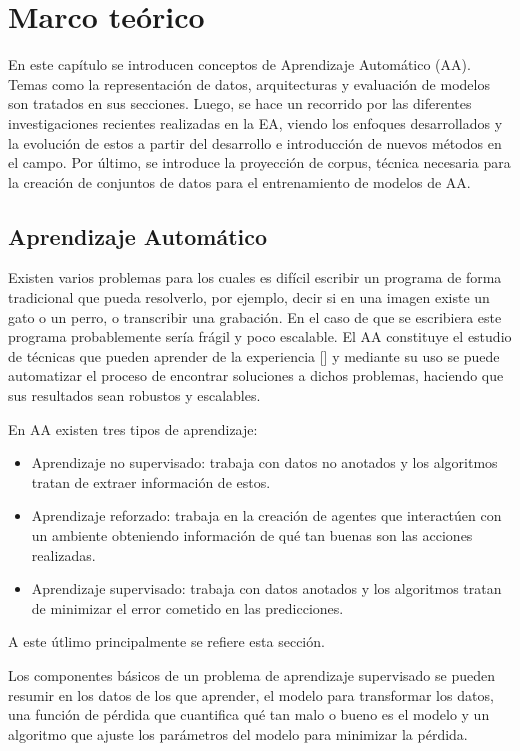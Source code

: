 \chapter{Marco teórico}\label{chapter:background}

En este capítulo se introducen conceptos de Aprendizaje Automático (AA). Temas
como la representación de datos, arquitecturas y evaluación de modelos son tratados en sus secciones.
Luego, se hace un recorrido por las diferentes investigaciones recientes realizadas en la EA, viendo
los enfoques desarrollados y la evolución de estos a partir del desarrollo e introducción de nuevos métodos en el
campo. Por último, se introduce la proyección de corpus, técnica necesaria para la creación de conjuntos 
de datos para el entrenamiento de modelos de AA.

\section{Aprendizaje Automático}

Existen varios problemas para los cuales es difícil escribir un programa de forma tradicional que pueda
resolverlo, por ejemplo, decir si en una imagen existe un gato o un perro, o transcribir una grabación. En el caso
de que se escribiera este programa probablemente sería frágil y poco escalable. El AA constituye el 
estudio de técnicas que pueden aprender de la experiencia [\cite{d2l}] y mediante su uso 
se puede automatizar el proceso de encontrar soluciones a dichos problemas, haciendo que sus resultados sean 
robustos y escalables. 

En AA existen tres tipos de aprendizaje:
\begin{itemize}
	\item Aprendizaje no supervisado: trabaja con datos no anotados y los algoritmos tratan de 
	extraer información de estos.
	\item Aprendizaje reforzado: trabaja en la creación de agentes que interactúen con 
	un ambiente obteniendo información de qué tan buenas son las acciones realizadas.
	\item Aprendizaje supervisado: trabaja con datos anotados y los algoritmos tratan de minimizar
	el error cometido en las predicciones.
\end{itemize}
A este útlimo principalmente se refiere esta sección.

Los componentes básicos de un problema de aprendizaje supervisado se pueden resumir en los datos de los que 
aprender, el modelo para transformar los datos, una función de pérdida que cuantifica qué tan malo o bueno es el 
modelo y un algoritmo que ajuste los parámetros del modelo para minimizar la pérdida.

